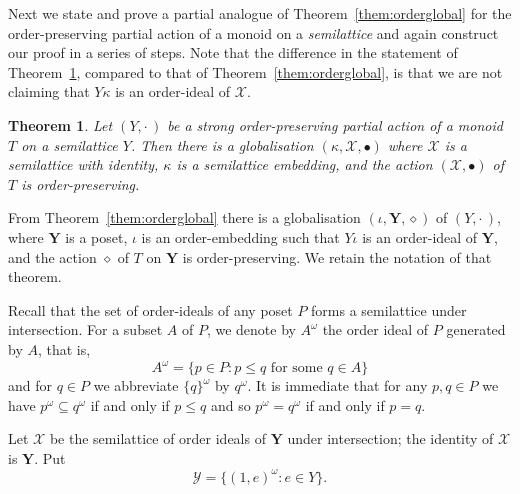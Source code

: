 \documentclass[12pt]{amsart}
\newtheorem{them}{Theorem}[section]
\theoremstyle{definition}
\theoremstyle{definition}
\numberwithin{them}{section}
\numberwithin{equation}{section}
\begin{document}
 Next we state and prove a partial analogue of Theorem~\ref{them:orderglobal} for the order-preserving partial action of a monoid on a {\em semilattice} and again construct our proof in a series of steps.  Note that the difference  in the statement of Theorem~\ref{them:slglobal}, compared to that of Theorem~\ref{them:orderglobal}, is that  we are not claiming that $Y\kappa$ is an order-ideal of $\mathcal{X}$. 

\begin{them}\label{them:slglobal} Let $(Y,\cdot\,)$ be a strong order-preserving partial action of a monoid $T$ on a semilattice $Y$. 
Then there is a globalisation $(\kappa, \mathcal{X}, \bullet)$ where $\mathcal{X}$ is a semilattice  with identity,  $\kappa$ is a semilattice embedding,   and the action $(\mathcal{X},\bullet)$ of $T$ is order-preserving.
\end{them}

From Theorem~\ref{them:orderglobal} there is a globalisation
$(\iota,\mathbf{Y},\diamond)$ of $(Y,\cdot\, )$, where $\mathbf{Y}$ is a poset, $\iota$ is an order-embedding such that $Y\iota$ is an order-ideal of $\mathbf{Y}$,  and the action $\diamond$ of $T$ on $\mathbf{Y}$ is order-preserving. We retain the notation of that theorem.


 
 Recall that the set of order-ideals of any poset $P$ forms a semilattice under intersection. For a subset $A$ of $P$,  we denote by $A^{\omega}$ 
 the order ideal of $P$ generated by $A$, that is,
 \[A^{\omega}=\{ p\in P:p\leq q\mbox{ for some }q\in A\} \]
 and for $q\in P$ we abbreviate $\{q\}^{\omega}$
 by $q^{\omega}$. It is immediate that for any $p,q\in P$ we have $p^\omega\subseteq q^\omega$ if and only if $p\leq q$ and so $p^\omega= q^\omega$ if and only if $p=q$. 

 
Let ${\mathcal{X}}$ be the semilattice of order ideals of  ${\mathbf{Y}}$ under intersection;  the identity of ${\mathcal{X}}$ is ${\mathbf{Y}}$. 
Put
\[{\mathcal{Y}} = \{(1, e)^\omega: e\in Y\}.\]
\end{document}
